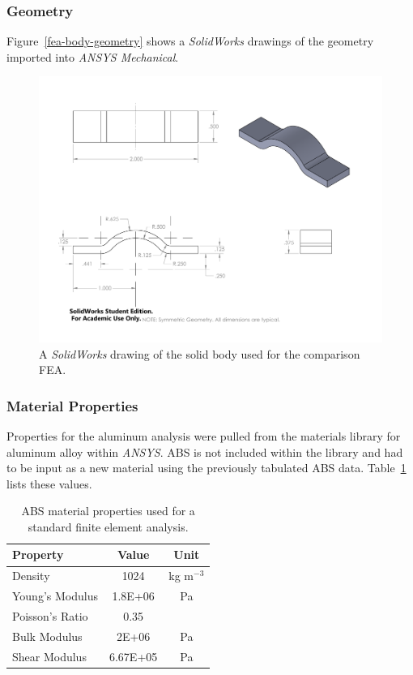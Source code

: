 \subsubsection{Geometry}

Figure~\ref{fea-body-geometry} shows a \emph{SolidWorks} drawings of the geometry imported into \emph{ANSYS Mechanical}.

\begin{figure}[htp]
\centering
\includegraphics[width=1\textwidth]{./figures/fea/fea-body-geometry}
\caption{A \emph{SolidWorks} drawing of the solid body used for the comparison FEA.}
\label{fig:fea-body-geometry}
\end{figure}

\clearpage

\subsubsection{Material Properties}

\indent

Properties for the aluminum analysis were pulled from the materials library for aluminum alloy within \emph{ANSYS}. ABS is not included within the library and had to be input as a new material using the previously tabulated ABS data. Table~\ref{tab:abs-properties} lists these values.\\

\begin{table}[htp]
    \centering
    \begin{tabular}{lcc}
        Property & Value & Unit \\ \hline
        
        Density & 1024 & kg m$^{-3}$\\ 
        Young's Modulus & 1.8E+06 & Pa\\
        Poisson's Ratio & 0.35 & \\
        Bulk Modulus & 2E+06 & Pa \\
        Shear Modulus & 6.67E+05 & Pa\\
        
    \end{tabular}
    \caption{ABS material properties used for a standard finite element analysis.}
    \label{tab:abs-properties}
\end{table}

